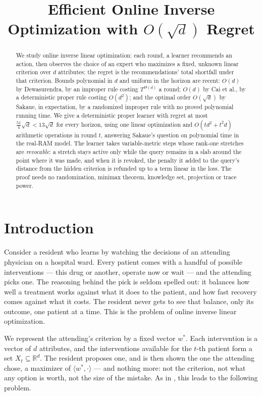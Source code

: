 \documentclass[11pt]{article}
\title{\vspace{-1.5cm}\bf Efficient Online Inverse Optimization with $O(\sqrt d)$ Regret}
\author{}
\date{}
\theoremstyle{plain}
\theoremstyle{definition}
\theoremstyle{remark}
\newcommand{\R}{\mathbb{R}}
\newcommand{\wstar}{w^{\ast}}
\newcommand{\ip}[2]{\langle #1, #2\rangle}
\begin{document}
\maketitle
\vspace{-4em}

\begin{abstract}
We study online inverse linear optimization: each round, a learner recommends an action, then
observes the choice of an expert who maximizes a fixed, unknown linear criterion over $d$
attributes; the regret is the recommendations' total shortfall under that criterion. Bounds
polynomial in $d$ and uniform in the horizon are recent: $O(d)$ by Dewasurendra, by an improper
rule costing $T^{\Theta(d)}$ a round; $O(d)$ by Cai et al., by a deterministic proper rule costing
$O(d^{2})$; and the optimal order $O(\sqrt d)$ by Sakaue, in expectation, by a randomized improper
rule with no proved polynomial running time. We give a deterministic proper learner with regret at
most $\tfrac{51}{4}\sqrt d<13\sqrt d$ for every horizon, using one linear optimization and
$O(td^{2}+t^{2}d)$ arithmetic operations in round $t$, answering Sakaue's question on polynomial
time in the real-RAM model. The learner takes variable-metric steps whose rank-one stretches are
\emph{revocable}: a stretch stays active only while the query remains in a slab around the point
where it was made, and when it is revoked, the penalty it added to the query's distance from the
hidden criterion is refunded up to a term linear in the loss. The proof needs no randomization,
minimax theorem, knowledge set, projection or trace power.
\end{abstract}

\section{Introduction}\label{sec:intro}

Consider a resident who learns by watching the decisions of an attending physician on a hospital
ward. Every patient comes with a handful of possible interventions --- this drug or another, operate
now or wait --- and the attending picks one. The reasoning behind the pick is seldom spelled out: it
balances how well a treatment works against what it does to the patient, and how fast recovery
comes against what it costs. The resident never gets to see that balance, only its outcome, one
patient at a time. This is the problem of online inverse linear optimization.

We represent the attending's criterion by a fixed vector $\wstar$. Each intervention is a vector of
$d$ attributes, and the interventions available for the $t$-th patient form a set
$X_t\subseteq\R^{d}$. The resident proposes one, and is then shown the one the attending chose, a
maximizer of $\ip{\wstar}{\cdot}$ --- and nothing more: not the criterion, not what any option is
worth, not the size of the mistake. As in \cite{Cai26}, this leads to the following problem.
\end{document}
